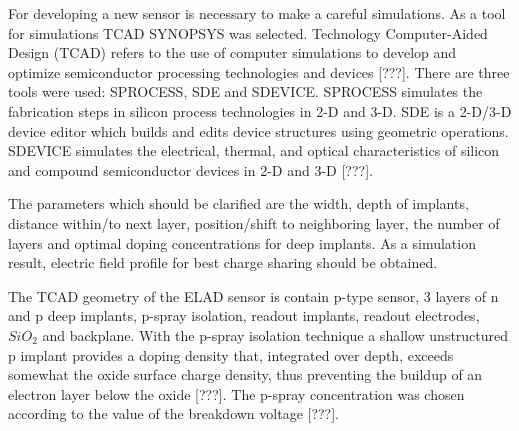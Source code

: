 For developing a new sensor is necessary to make a careful simulations. As a tool for simulations TCAD SYNOPSYS was selected. Technology Computer-Aided Design (TCAD) refers to the use of computer simulations to develop and optimize semiconductor processing technologies and devices [???]. There are three tools were used: SPROCESS, SDE and SDEVICE. SPROCESS simulates the fabrication steps in silicon process technologies in 2-D and 3-D. SDE is a 2-D/3-D device editor which builds and edits device structures using geometric operations. SDEVICE simulates the electrical, thermal, and optical characteristics of silicon and compound semiconductor devices in 2-D and 3-D [???].

The parameters which should be clarified are the width, depth of implants, distance within/to next layer, position/shift to neighboring layer, the number of layers and optimal doping concentrations for deep implants. As a simulation result, electric field profile for best charge sharing should be obtained. 

The TCAD geometry of the ELAD sensor is contain p-type sensor, 3 layers of n and p deep implants, p-spray isolation, readout implants, readout electrodes, $SiO_2$ and backplane. With the p-spray isolation technique a shallow unstructured p implant provides a doping density that, integrated over depth, exceeds somewhat the oxide surface charge density, thus preventing the buildup of an electron layer below the oxide [???]. The p-spray concentration was chosen according to the value of the breakdown voltage [???].